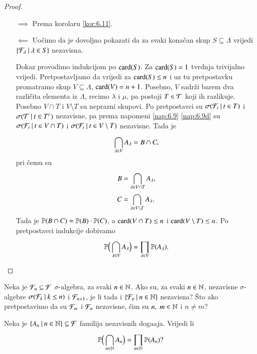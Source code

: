 \begin{proof}
    \quad
    \begin{enumerate}
        \item[$\implies$] Prema korolaru \ref{kor:6.11}.
        \item[$\impliedby$] Uo\v cimo da je dovoljno pokazati da za svaki kona\v can skup $S \subseteq \Lambda$ vrijedi $\{{\mathcal{F}_\lambda} \: | \: {\lambda \in S}\}$ nezavisna.
        
        Dokaz provodimo indukcijom po $\mathrm{card}({S})$.
        Za $\mathrm{card}({S}) = 1$ tvrdnja trivijalno vrijedi.
        Pretpostavljamo da vrijedi za $\mathrm{card}({S}) \leq n$ i uz tu pretpostavku promatramo skup $V \subseteq \Lambda$, $\mathrm{card}({V}) = n + 1$.
        Posebno, $V$ sadr\v zi barem dva razli\v cita elementa iz $\Lambda$, recimo $\lambda$ i $\mu$, pa postoji $T \in \mathcal{T}$ koji ih razlikuje.
        Posebno $V \cap T$ i $V \setminus T$ su neprazni skupovi.
        Po pretpostavci su $\sigma({\mathcal{F}_t} \: | \: {t \in T})$ i $\sigma({\mathcal{T}} \: | \: {t \in T^c})$ nezavisne, pa prema napomeni \ref{nap:6.9}  \ref{nap:6.9d} su $\sigma({\mathcal{F}_t} \: | \: {t \in V \cap T})$ i $\sigma({\mathcal{F}_t} \: | \: {t \in V \setminus T})$ nezavisne.
        Tada je
        \begin{equation*}
            \bigcap\limits_{\lambda \in V}^{} A_\lambda = B \cap C,
        \end{equation*}
        pri \v cemu su
        \begin{equation*}
            \begin{aligned}
                B &= \bigcap\limits_{\lambda \in V \cap T}^{} A_\lambda,\\
                C &= \bigcap\limits_{\lambda \in V \setminus T}^{} A_\lambda.
            \end{aligned}
        \end{equation*}
        Tada je $\mathbb{P}({B \cap C}) = \mathbb{P}({B}) \cdot \mathbb{P}({C})$, a $\mathrm{card}({V \cap T}) \leq n$ i $\mathrm{card}({V \setminus T}) \leq n$.
        Po pretpostavci indukcije dobivamo
        \begin{equation*}
            \mathbb{P} \Big( \bigcap\limits_{\lambda \in V}^{} A_\lambda \Big) = \prod\limits_{\lambda \in V}^{} \mathbb{P}({A_\lambda}).
        \end{equation*}
    \end{enumerate}
\end{proof}

\begin{zad} \label{zad:6.13}
    Neka je $\mathcal{F}_n \subseteq \mathcal{F}$ $\sigma$-algebra, za svaki $n \in \mathbb{N}$.
    Ako su, za svaki $n \in \mathbb{N}$, nezavisne $\sigma$-algebre $\sigma({\mathcal{F}_k} \: | \: {k \leq n})$ i $\mathcal{F}_{n + 1}$, je li tada i $\{{\mathcal{F}_n} \: | \: {n \in \mathbb{N}}\}$ nezavisna?
    \v Sto ako pretpostavimo da su $\mathcal{F}_m$ i $\mathcal{F}_n$ nezavisne, \v cim su $n, \; m \in \mathbb{N}$ i $n \neq m$?
\end{zad}

\begin{zad} \label{zad:6.14}
    Neka je $\{{A_n} \: | \: {n \in \mathbb{N}}\} \subseteq \mathcal{F}$ familija nezavisnih doga\dj aja.
    Vrijedi li
    \begin{equation*}
        \mathbb{P} \Big( \bigcap\limits_{n \in \mathbb{N}}^{} A_n \Big) = \prod\limits_{n \in \mathbb{N}}^{} \mathbb{P}({A_n})?
    \end{equation*}
\end{zad}